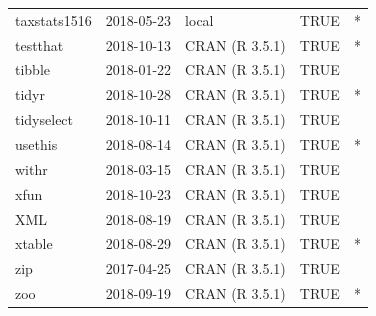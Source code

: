 \documentclass{grattan}\usepackage[]{graphicx}\usepackage[]{color}
\begin{document}
\begin{longtable}{lllll}
  taxstats1516 & 2018-05-23 & local & TRUE & * \\ 
  testthat & 2018-10-13 & CRAN (R 3.5.1) & TRUE & * \\ 
  tibble & 2018-01-22 & CRAN (R 3.5.1) & TRUE &  \\ 
  tidyr & 2018-10-28 & CRAN (R 3.5.1) & TRUE & * \\ 
  tidyselect & 2018-10-11 & CRAN (R 3.5.1) & TRUE &  \\ 
  usethis & 2018-08-14 & CRAN (R 3.5.1) & TRUE & * \\ 
  withr & 2018-03-15 & CRAN (R 3.5.1) & TRUE &  \\ 
  xfun & 2018-10-23 & CRAN (R 3.5.1) & TRUE &  \\ 
  XML & 2018-08-19 & CRAN (R 3.5.1) & TRUE &  \\ 
  xtable & 2018-08-29 & CRAN (R 3.5.1) & TRUE & * \\ 
  zip & 2017-04-25 & CRAN (R 3.5.1) & TRUE &  \\ 
  zoo & 2018-09-19 & CRAN (R 3.5.1) & TRUE & * \\ 
   \bottomrule
\end{longtable}


\clearpage
\end{document}
